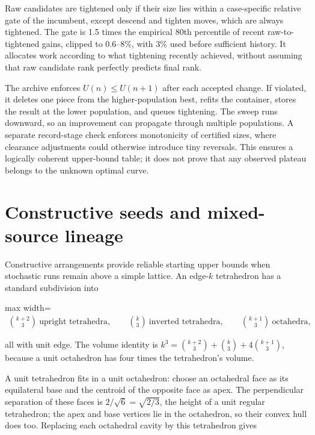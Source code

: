 \documentclass[11pt,a4paper]{article}
\begin{document}
Raw candidates are tightened only if their size lies within a case-specific relative gate of the incumbent, except descend and tighten moves, which are always tightened. The gate is 1.5 times the empirical 80th percentile of recent raw-to-tightened gains, clipped to 0.6--8\%, with 3\% used before sufficient history. It allocates work according to what tightening recently achieved, without assuming that raw candidate rank perfectly predicts final rank.

The archive enforces \(U(n)\le U(n+1)\) after each accepted change. If violated, it deletes one piece from the higher-population best, refits the container, stores the result at the lower population, and queues tightening. The sweep runs downward, so an improvement can propagate through multiple populations. A separate record-stage check enforces monotonicity of certified sizes, where clearance adjustments could otherwise introduce tiny reversals. This ensures a logically coherent upper-bound table; it does not prove that any observed plateau belongs to the unknown optimal curve.

\section{Constructive seeds and mixed-source lineage}

Constructive arrangements provide reliable starting upper bounds when stochastic runs remain above a simple lattice. An edge-\(k\) tetrahedron has a standard subdivision into

\begin{center}\begin{adjustbox}{max width=\linewidth}$\displaystyle\begin{aligned}
\binom{k+2}{3}\ \text{upright tetrahedra},\qquad
\binom{k}{3}\ \text{inverted tetrahedra},\qquad
\binom{k+1}{3}\ \text{octahedra},
\end{aligned}$\end{adjustbox}\end{center}

all with unit edge. The volume identity is \(k^3=\binom{k+2}{3}+\binom{k}{3}+4\binom{k+1}{3}\), because a unit octahedron has four times the tetrahedron's volume.

A unit tetrahedron fits in a unit octahedron: choose an octahedral face as its equilateral base and the centroid of the opposite face as apex. The perpendicular separation of these faces is \(2/\sqrt6=\sqrt{2/3}\), the height of a unit regular tetrahedron; the apex and base vertices lie in the octahedron, so their convex hull does too. Replacing each octahedral cavity by this tetrahedron gives
\end{document}
